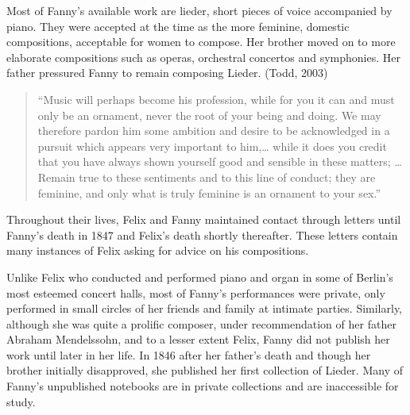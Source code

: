 \documentclass[12pt,twoside]{reedthesis}
\theoremstyle{definition}
\theoremstyle{definition}
\theoremstyle{definition}
\theoremstyle{remark}
\begin{document}
Most of Fanny's available work are lieder, short pieces of voice
accompanied by piano. They were accepted at the time as the more
feminine, domestic compositions, acceptable for women to compose. Her
brother moved on to more elaborate compositions such as operas,
orchestral concertos and symphonies. Her father pressured Fanny to
remain composing Lieder. (Todd, 2003)
\begin{quote}
``Music will perhaps become his profession, while for you it can and
must only be an ornament, never the root of your being and doing. We may
therefore pardon him some ambition and desire to be acknowledged in a
pursuit which appears very important to him,\ldots{} while it does you
credit that you have always shown yourself good and sensible in these
matters; \ldots{} Remain true to these sentiments and to this line of
conduct; they are feminine, and only what is truly feminine is an
ornament to your sex.''
\end{quote}
Throughout their lives, Felix and Fanny maintained contact through
letters until Fanny's death in 1847 and Felix's death shortly
thereafter. These letters contain many instances of Felix asking for
advice on his compositions.

Unlike Felix who conducted and performed piano and organ in some of
Berlin's most esteemed concert halls, most of Fanny's performances were
private, only performed in small circles of her friends and family at
intimate parties. Similarly, although she was quite a prolific composer,
under recommendation of her father Abraham Mendelssohn, and to a lesser
extent Felix, Fanny did not publish her work until later in her life. In
1846 after her father's death and though her brother initially
disapproved, she published her first collection of Lieder. Many of
Fanny's unpublished notebooks are in private collections and are
inaccessible for study.
\end{document}
